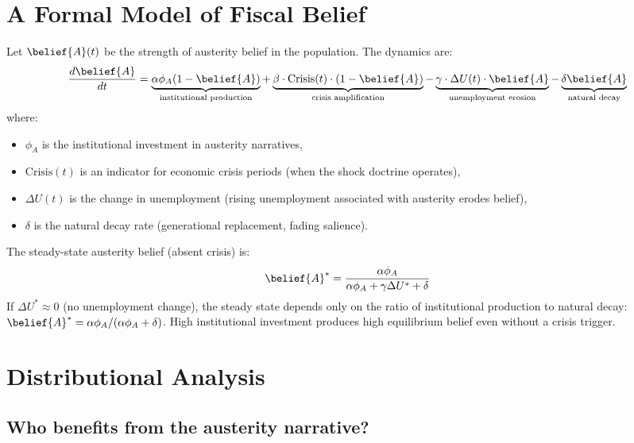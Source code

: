 \section{A Formal Model of Fiscal Belief}
\label{sec:ch25-model}

\begin{model}
\label{mod:austerity-dynamics}
Let $\belief{A}(t)$ be the strength of austerity belief in the population.
The dynamics are:
\[
  \frac{d\belief{A}}{dt} = \underbrace{\alpha \phi_A (1 - \belief{A})}_{\text{institutional production}} + \underbrace{\beta \cdot \text{Crisis}(t) \cdot (1 - \belief{A})}_{\text{crisis amplification}} - \underbrace{\gamma \cdot \Delta U(t) \cdot \belief{A}}_{\text{unemployment erosion}} - \underbrace{\delta \belief{A}}_{\text{natural decay}}
\]
where:
\begin{itemize}[nosep]
  \item $\phi_A$ is the institutional investment in austerity narratives,
  \item $\text{Crisis}(t)$ is an indicator for economic crisis periods (when the shock doctrine operates),
  \item $\Delta U(t)$ is the change in unemployment (rising unemployment associated with austerity erodes belief),
  \item $\delta$ is the natural decay rate (generational replacement, fading salience).
\end{itemize}
\end{model}

\begin{proposition}
\label{prop:austerity-persistence}
The steady-state austerity belief (absent crisis) is:
\[
  \belief{A}^* = \frac{\alpha \phi_A}{\alpha \phi_A + \gamma \Delta U^* + \delta}
\]
If $\Delta U^* \approx 0$ (no unemployment change), the steady state depends only on the ratio of institutional production to natural decay: $\belief{A}^* = \alpha \phi_A / (\alpha \phi_A + \delta)$.
High institutional investment produces high equilibrium belief even without a crisis trigger.
\end{proposition}

\section{Distributional Analysis}
\label{sec:ch25-distributional}

\subsection{Who benefits from the austerity narrative?}

